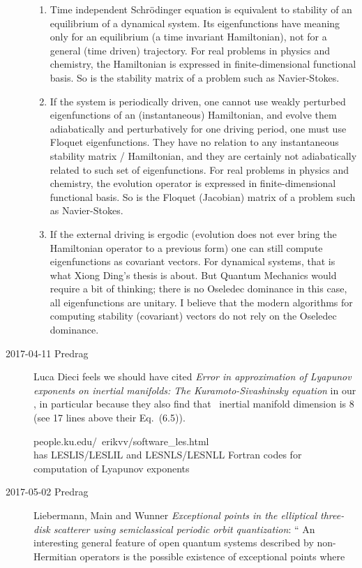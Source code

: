 \begin{description}
\begin{enumerate}
  \item Time independent Schr\"odinger equation is equivalent to stability
of an equilibrium of a dynamical system. Its eigenfunctions have meaning
only for an equilibrium (a time invariant Hamiltonian), not for a general
(time driven) trajectory. For real problems in physics and chemistry, the
Hamiltonian is expressed in finite-dimensional functional basis. So is
the stability matrix of a problem such as Navier-Stokes.
  \item If the system is periodically driven, one cannot use
weakly perturbed eigenfunctions of an (instantaneous) Hamiltonian, and
evolve them adiabatically and perturbatively for one driving period, one must
use Floquet eigenfunctions. They have no relation to any instantaneous
stability matrix / Hamiltonian, and they are
certainly not adiabatically related to such set of eigenfunctions.
For real problems in physics and chemistry, the
evolution operator is expressed in finite-dimensional functional basis. So is
the Floquet (Jacobian) matrix of a problem such as Navier-Stokes.
  \item If the external driving is ergodic (evolution does not ever bring
the Hamiltonian operator to a previous form) one can still compute
eigenfunctions as covariant vectors.  For dynamical systems, that is
what Xiong Ding's thesis is about.
But Quantum Mechanics would require a bit of thinking; there is no
Oseledec dominance in this case, all eigenfunctions are unitary. I
believe that the modern algorithms for computing
stability (covariant) vectors do not rely on the Oseledec dominance.
\end{enumerate}

\item[2017-04-11 Predrag]
Luca Dieci feels we should have cited  {\em Error in
approximation of {Lyapunov} exponents on inertial manifolds: {The
Kuramoto-Sivashinsky} equation} in our , in
particular because they also find that \KS\ inertial manifold dimension
is 8 (see 17 lines above their Eq.~(6.5)).

{people.ku.edu/~erikvv/software\_les.html}
\\  has
LESLIS/LESLIL and LESNLS/LESNLL Fortran codes for computation of Lyapunov
exponents

\item[2017-05-02 Predrag]                               \inCB
Liebermann, Main and Wunner
{\em Exceptional points in the elliptical three-disk scatterer using
semiclassical periodic orbit quantization}: ``
An interesting general feature of open quantum systems described by
non-Hermitian operators is the possible existence of exceptional points where


\end{description}
